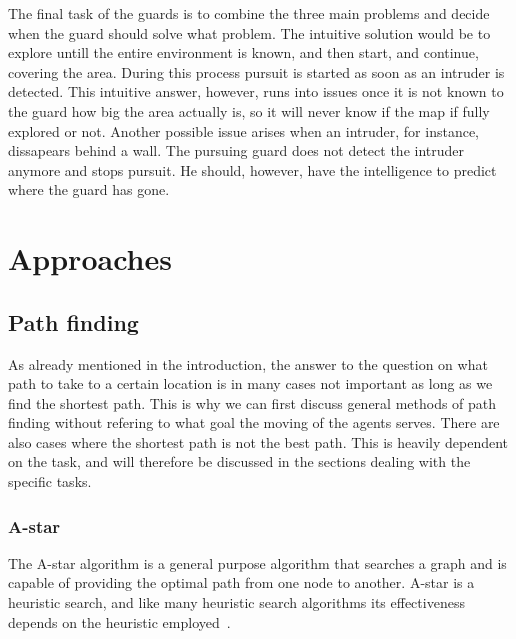 \documentclass{report}
\begin{document}
	The final task of the guards is to combine the three main problems and decide when the guard should solve what problem. The intuitive solution would be to explore untill the entire environment is known, and then start, and continue, covering the area. During this process pursuit is started as soon as an intruder is detected. This intuitive answer, however, runs into issues once it is not known to the guard how big the area actually is, so it will never know if the map if fully explored or not. Another possible issue arises when an intruder, for instance, dissapears behind a wall. The pursuing guard does not detect the intruder anymore and stops pursuit. He should, however, have the intelligence to predict where the guard has gone.

\chapter{Approaches}
	
	\section{Path finding}
		As already mentioned in the introduction, the answer to the question on what path to take to a certain location is in many cases not important as long as we find the shortest path. This is why we can first discuss general methods of path finding without refering to what goal the moving of the agents serves. There are also cases where the shortest path is not the best path. This is heavily dependent on the task, and will therefore be discussed in the sections dealing with the specific tasks.

		\subsection{A-star}
			The A-star algorithm is a general purpose algorithm that searches a graph and is capable of providing the optimal path from one node to another. A-star is a heuristic search, and like many heuristic search algorithms its effectiveness depends on the heuristic employed~\cite{4082128}.
\end{document}
